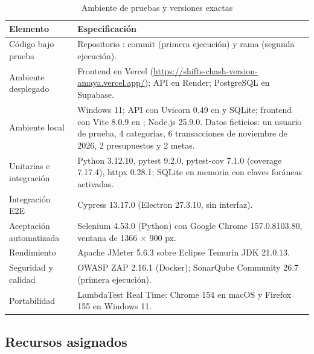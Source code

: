 \begin{table}[H]
\caption{Ambiente de pruebas y versiones exactas}
\label{tab:ambiente}
\footnotesize
\begin{tabularx}{\linewidth}{L{3.6cm} Y}
\toprule
Elemento & Especificación \\
\midrule
Código bajo prueba & Repositorio : commit  (primera ejecución) y rama  (segunda ejecución). \\
Ambiente desplegado & Frontend en Vercel (\url{https://shifts-chash-version-amaya.vercel.app/}); API en Render; PostgreSQL en Supabase. \\
Ambiente local & Windows 11; API con Uvicorn 0.49 en  y SQLite; frontend con Vite 8.0.9 en ; Node.js 25.9.0. Datos ficticios: un usuario de prueba, 4 categorías, 6 transacciones de noviembre de 2026, 2 presupuestos y 2 metas. \\
Unitarias e integración & Python 3.12.10, pytest 9.2.0, pytest-cov 7.1.0 (coverage 7.17.4), httpx 0.28.1; SQLite en memoria con claves foráneas activadas. \\
Integración E2E & Cypress 13.17.0 (Electron 27.3.10, sin interfaz). \\
Aceptación automatizada & Selenium 4.53.0 (Python) con Google Chrome 157.0.8103.80, ventana de 1366 × 900 px. \\
Rendimiento & Apache JMeter 5.6.3 sobre Eclipse Temurin JDK 21.0.13. \\
Seguridad y calidad & OWASP ZAP 2.16.1 (Docker); SonarQube Community 26.7 (primera ejecución). \\
Portabilidad & LambdaTest Real Time: Chrome 154 en macOS y Firefox 155 en Windows 11. \\
\bottomrule
\end{tabularx}
\end{table}

\subsection{Recursos asignados}

